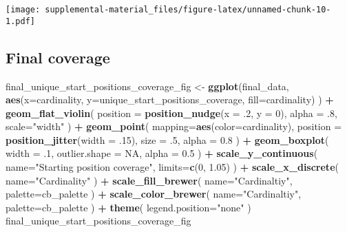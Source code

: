 \documentclass[]{book}
\newenvironment{Shaded}{\begin{snugshade}}{\end{snugshade}}
\newcommand{\DataTypeTok}[1]{\textcolor[rgb]{0.13,0.29,0.53}{#1}}
\newcommand{\DecValTok}[1]{\textcolor[rgb]{0.00,0.00,0.81}{#1}}
\newcommand{\FloatTok}[1]{\textcolor[rgb]{0.00,0.00,0.81}{#1}}
\newcommand{\KeywordTok}[1]{\textcolor[rgb]{0.13,0.29,0.53}{\textbf{#1}}}
\newcommand{\NormalTok}[1]{#1}
\newcommand{\OperatorTok}[1]{\textcolor[rgb]{0.81,0.36,0.00}{\textbf{#1}}}
\newcommand{\OtherTok}[1]{\textcolor[rgb]{0.56,0.35,0.01}{#1}}
\newcommand{\StringTok}[1]{\textcolor[rgb]{0.31,0.60,0.02}{#1}}
\begin{document}
\texttt{[image: supplemental-material\_files/figure-latex/unnamed-chunk-10-1.pdf]}

\hypertarget{final-coverage}{%
\subsection{Final coverage}\label{final-coverage}}

\begin{Shaded}
\begin{Highlighting}[]
\NormalTok{final_unique_start_positions_coverage_fig <-}\StringTok{ }\KeywordTok{ggplot}\NormalTok{(final_data,  }\KeywordTok{aes}\NormalTok{(}\DataTypeTok{x=}\NormalTok{cardinality, }\DataTypeTok{y=}\NormalTok{unique_start_positions_coverage, }\DataTypeTok{fill=}\NormalTok{cardinality)}
\NormalTok{  ) }\OperatorTok{+}
\StringTok{  }\KeywordTok{geom_flat_violin}\NormalTok{(}
    \DataTypeTok{position =} \KeywordTok{position_nudge}\NormalTok{(}\DataTypeTok{x =} \FloatTok{.2}\NormalTok{, }\DataTypeTok{y =} \DecValTok{0}\NormalTok{),}
    \DataTypeTok{alpha =} \FloatTok{.8}\NormalTok{,}
    \DataTypeTok{scale=}\StringTok{"width"}
\NormalTok{  ) }\OperatorTok{+}
\StringTok{  }\KeywordTok{geom_point}\NormalTok{(}
    \DataTypeTok{mapping=}\KeywordTok{aes}\NormalTok{(}\DataTypeTok{color=}\NormalTok{cardinality),}
    \DataTypeTok{position =} \KeywordTok{position_jitter}\NormalTok{(}\DataTypeTok{width =} \FloatTok{.15}\NormalTok{),}
    \DataTypeTok{size =} \FloatTok{.5}\NormalTok{,}
    \DataTypeTok{alpha =} \FloatTok{0.8}
\NormalTok{  ) }\OperatorTok{+}
\StringTok{  }\KeywordTok{geom_boxplot}\NormalTok{(}
    \DataTypeTok{width =} \FloatTok{.1}\NormalTok{,}
    \DataTypeTok{outlier.shape =} \OtherTok{NA}\NormalTok{,}
    \DataTypeTok{alpha =} \FloatTok{0.5}
\NormalTok{  ) }\OperatorTok{+}
\StringTok{  }\KeywordTok{scale_y_continuous}\NormalTok{(}
    \DataTypeTok{name=}\StringTok{"Starting position coverage"}\NormalTok{,}
    \DataTypeTok{limits=}\KeywordTok{c}\NormalTok{(}\DecValTok{0}\NormalTok{, }\FloatTok{1.05}\NormalTok{)}
\NormalTok{  ) }\OperatorTok{+}
\StringTok{  }\KeywordTok{scale_x_discrete}\NormalTok{(}
    \DataTypeTok{name=}\StringTok{"Cardinality"}
\NormalTok{  ) }\OperatorTok{+}
\StringTok{  }\KeywordTok{scale_fill_brewer}\NormalTok{(}
    \DataTypeTok{name=}\StringTok{"Cardinaltiy"}\NormalTok{,}
    \DataTypeTok{palette=}\NormalTok{cb_palette}
\NormalTok{  ) }\OperatorTok{+}
\StringTok{  }\KeywordTok{scale_color_brewer}\NormalTok{(}
    \DataTypeTok{name=}\StringTok{"Cardinaltiy"}\NormalTok{,}
    \DataTypeTok{palette=}\NormalTok{cb_palette}
\NormalTok{  ) }\OperatorTok{+}
\StringTok{  }\KeywordTok{theme}\NormalTok{(}
    \DataTypeTok{legend.position=}\StringTok{"none"}
\NormalTok{  )}
\NormalTok{final_unique_start_positions_coverage_fig}
\end{Highlighting}
\end{Shaded}
\end{document}
